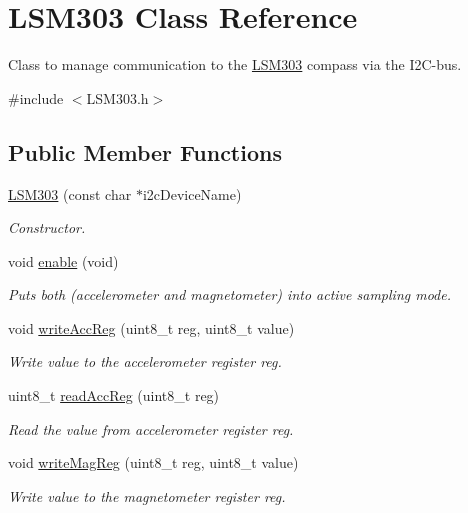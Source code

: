 \hypertarget{class_l_s_m303}{\section{\-L\-S\-M303 \-Class \-Reference}
\label{class_l_s_m303}
}


\-Class to manage communication to the \hyperlink{class_l_s_m303}{\-L\-S\-M303} compass via the \-I2\-C-\/bus.  




{\ttfamily \#include $<$\-L\-S\-M303.\-h$>$}

\subsection*{\-Public \-Member \-Functions}
\begin{DoxyCompactItemize}
\item 
\hyperlink{class_l_s_m303_a372710f74d63e809ef08348d919a2842}{\-L\-S\-M303} (const char $\ast$i2c\-Device\-Name)
\begin{DoxyCompactList}\small\item\em \-Constructor. \end{DoxyCompactList}\item 
void \hyperlink{class_l_s_m303_af2c1baa290df19e7cd4667a13a68a19a}{enable} (void)
\begin{DoxyCompactList}\small\item\em \-Puts both (accelerometer and magnetometer) into active sampling mode. \end{DoxyCompactList}\item 
void \hyperlink{class_l_s_m303_a3baf5341cf9d7d789b81b1cec7e81f12}{write\-Acc\-Reg} (uint8\-\_\-t reg, uint8\-\_\-t value)
\begin{DoxyCompactList}\small\item\em \-Write value to the accelerometer register reg. \end{DoxyCompactList}\item 
uint8\-\_\-t \hyperlink{class_l_s_m303_a26ba086aec95c01c05e6b980383d1ed9}{read\-Acc\-Reg} (uint8\-\_\-t reg)
\begin{DoxyCompactList}\small\item\em \-Read the value from accelerometer register reg. \end{DoxyCompactList}\item 
void \hyperlink{class_l_s_m303_a70b49953d20ff311bc23dfa8c1ec7a4f}{write\-Mag\-Reg} (uint8\-\_\-t reg, uint8\-\_\-t value)
\begin{DoxyCompactList}\small\item\em \-Write value to the magnetometer register reg. \end{DoxyCompactList}\item 

\end{DoxyCompactItemize}
